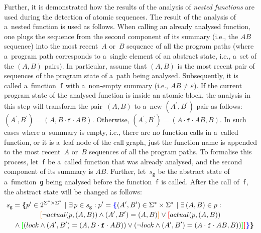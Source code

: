 Further, it is demonstrated how the results of the analysis of \emph{nested functions} are used during the detection of atomic sequences. The result of the analysis of a~nested function is used as follows. When calling an already analysed function, one plugs the sequence from the second component of its summary (i.e., the $ AB $ sequence) into the most recent~$ A $ or~$ B $ sequence of all the program paths (where a~program path corresponds to a~single element of an abstract state, i.e., a~set of the $ (A, B) $ pairs). In particular, assume that $ (A, B) $ is the most recent pair of sequences of the program state of a~path being analysed. Subsequently, it is called a~function~\texttt{f} with a~non-empty summary (i.e., $ AB \neq \varepsilon $). If the current program state of the analysed function is inside an atomic block, the analysis in this step will transform the pair~$ (A, B) $ to a~new $ (A^\prime, B^\prime) $ pair as follows: $ (A^\prime, B^\prime) = (A, B \cdot \mathtt{f} \cdot AB) $. Otherwise, $ (A^\prime, B^\prime) = (A \cdot \mathtt{f} \cdot AB, B) $. In such cases where a~summary is empty, i.e., there are no function calls in a~called function, or it is a~leaf node of the call graph, just the function name is appended to the most recent~$ A $ or~$ B $ sequences of all the program paths. To formalise this process, let~\texttt{f} be a~called function that was already analysed, and the second component of its summary is $ AB $. Further, let~$ s_\mathtt{g} $ be the abstract state of a~function~\texttt{g} being analysed before the function~\texttt{f} is called. After the call of~\texttt{f}, the abstract state will be changed as follows:
$$
\begin{multlined}
    s_\mathtt{g} = \bb{\{}p^\prime \in 2^{\Sigma^* \times \Sigma^*}\ |\ \exists\,p \in s_\mathtt{g} : p^\prime = \bA{\{}(A^\prime, B^\prime) \in \Sigma^* \times \Sigma^*\ |\ \exists\,(A, B) \in p : \\
%
    \bB{[}\neg actual(p, (A, B)) \wedge (A^\prime, B^\prime) = (A, B)\bB{]} \vee \bC{[}actual(p, (A, B)) \\
%
    \wedge \bD{[}(lock \wedge {(A^\prime, B^\prime)} = {(A, B \cdot \mathtt{f} \cdot AB)}) \vee (\neg lock \wedge {(A^\prime, B^\prime)} = {(A \cdot \mathtt{f} \cdot AB, B)})%
%
    \bD{]}\bC{]}\bA{\}}\bb{\}}
\end{multlined}
$$


